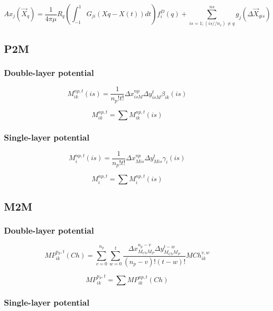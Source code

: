 \documentclass[letter,10pt]{article}
\begin{document}
\begin{equation}
Ax_j(\vec{X}_q) = \frac{1}{4\pi\mu}R_q\left(\int_{-1}^1 G_{ji}(Xq-X(t))dt\right)f_i^D(q)+ \sum_{is=1; {(is//n_c) \neq q}}^{ns}g_j(\Delta \vec{X}_{qis})
\label{P2PS-L}
\end{equation}

\subsection{P2M}

\subsubsection{Double-layer potential}

\begin{equation}
M_{ik}^{np,t}(is) = \frac{1}{n_p!t!}\Delta x_{isM}^{np}\Delta y_{isM}^{t}\beta_{ik}(is)
\end{equation}

$$M_{ik}^{np,t} = \sum M_{ik}^{np,t}(is)$$

\subsubsection{Single-layer potential}

\begin{equation}
M_{i}^{np,t}(is) = \frac{1}{n_p!t!}\Delta x_{Mis}^{np}\Delta y_{Mis}^{t}\gamma_{i}(is)
\end{equation}

$$M_{i}^{np,t} = \sum M_{i}^{np,t}(is)$$

\subsection{M2M}

\subsubsection{Double-layer potential}

\begin{equation}
MP_{ik}^{n_p,t}(Ch) = \sum_{v=0}^{n_p}\sum_{w=0}^{t}\frac{\Delta x_{M_{Ch}M_P}^{n_p-v} \Delta y_{M_{Ch}M_P}^{t-w}}{(n_p-v)!(t-w)!}MCh_{ik}^{v,w}
\end{equation}

$$MP_{ik}^{n_p,t}=\sum MP_{ik}^{np,t}(Ch)$$

\subsubsection{Single-layer potential}
\end{document}
